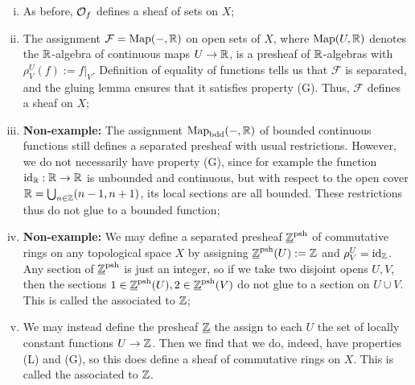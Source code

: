 \begin{eg}
	\label{eg:sheaf_(non)examples}
	\begin{enumerate}[(i)]
		\item As before, $\mathcal{O}_f$ defines a sheaf of sets on $X$;
		\item The assignment $\mathcal{F} = \mathrm{Map}(-, \mathbb{R})$ on open sets of $X$, where $\mathrm{Map}(U, \mathbb{R})$ denotes the $\mathbb{R}$-algebra of continuous maps $U \to \mathbb{R}$, is a presheaf of $\mathbb{R}$-algebras with $\rho^U_V(f) := f|_V$. Definition of equality of functions tells us that $\mathcal{F}$ is separated, and the gluing lemma ensures that it satisfies property (G). Thus, $\mathcal{F}$ defines a sheaf on $X$;
		\item \textbf{Non-example:} The assignment $\mathrm{Map}_{\mathrm{bdd}}(-, \mathbb{R})$ of bounded continuous functions still defines a separated presheaf with usual restrictions. However, we do not necessarily have property (G), since for example the function $\mathrm{id}_{\mathbb{R}} : \mathbb{R} \to \mathbb{R}$ is unbounded and continuous, but with respect to the open cover $\mathbb{R} = \bigcup_{n \in \mathbb{Z}} (n-1, n+1)$, its local sections are all bounded. These restrictions thus do not glue to a bounded function;
		\item \textbf{Non-example:} We may define a separated presheaf $\underline{\mathbb{Z}}^\text{psh}$ of commutative rings on any topological space $X$ by assigning $\underline{\mathbb{Z}}^\text{psh}(U) := \mathbb{Z}$ and $\rho^U_V = \mathrm{id}_{\mathbb{Z}}$. Any section of $\underline{\mathbb{Z}}^\text{psh}$ is just an integer, so if we take two disjoint opens $U, V$, then the sections $1 \in \underline{\mathbb{Z}}^\text{psh}(U), 2 \in \underline{\mathbb{Z}}^\text{psh}(V)$ do not glue to a section on $U\cup V$. This is called the  associated to $\mathbb{Z}$;
		\item We may instead define the presheaf $\underline{\mathbb{Z}}$ the assign to each $U$ the set of locally constant functions $U \to \mathbb{Z}$. Then we find that we do, indeed, have properties (L) and (G), so this does define a sheaf of commutative rings on $X$. This is called the  associated to $\mathbb{Z}$.
	\end{enumerate}
\end{eg}


